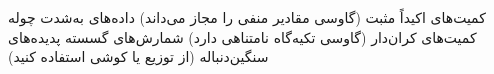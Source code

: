 \PSno{} کمیت‌های اکیداً مثبت (گاوسی مقادیر منفی را مجاز می‌داند)\PSbr{}\PSno{} داده‌های به‌شدت چوله\PSbr{}\PSno{} کمیت‌های کران‌دار (گاوسی تکیه‌گاه نامتناهی دارد)\PSbr{}\PSno{} شمارش‌های گسسته\PSbr{}\PSno{} پدیده‌های سنگین‌دنباله (از توزیع  یا کوشی استفاده کنید)



\begin{Shaded}
\begin{Highlighting}[]
 \OperatorTok{=} \OperatorTok{;}           
 \OperatorTok{=} \OperatorTok{;}      

 \OperatorTok{=} \NormalTok{(} \OperatorTok{{-}} \OperatorTok{*}\OperatorTok{,}  \OperatorTok{+} \OperatorTok{*}\OperatorTok{,} \NormalTok{)}\OperatorTok{;}
 \OperatorTok{=} \NormalTok{(}\OperatorTok{,} \OperatorTok{,} \NormalTok{)}\OperatorTok{;}


\end{Highlighting}
\end{Shaded}
